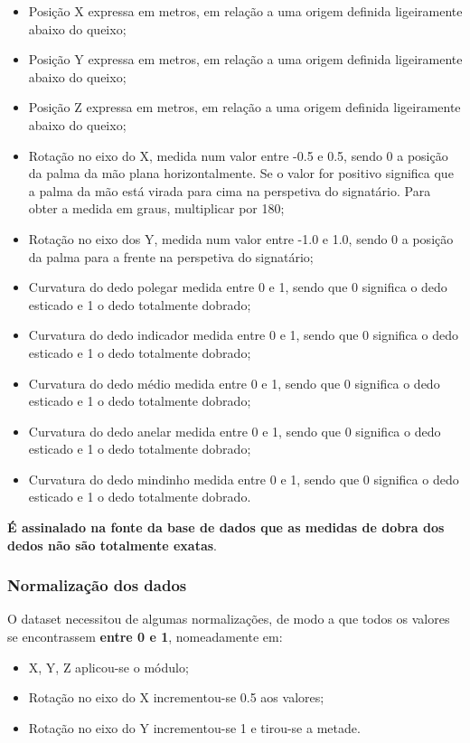 \documentclass[10pt,a4paper]{article}
\begin{document}
\begin{itemize}
\item Posição X expressa em metros, em relação a uma origem definida ligeiramente abaixo do queixo;
\item Posição Y expressa em metros, em relação a uma origem definida ligeiramente abaixo do queixo;
\item Posição Z expressa em metros, em relação a uma origem definida ligeiramente abaixo do queixo;
\item Rotação no eixo do X, medida num valor entre -0.5 e 0.5, sendo 0 a posição da palma da mão plana horizontalmente. Se o valor for positivo significa que a palma da mão está virada para cima na perspetiva do signatário. Para obter a medida em graus, multiplicar por 180;
\item Rotação no eixo dos Y, medida num valor entre -1.0 e 1.0, sendo 0 a posição da palma para a frente na perspetiva do signatário;
\item Curvatura do dedo polegar medida entre 0 e 1, sendo que 0 significa o dedo esticado e 1 o dedo totalmente dobrado;
\item Curvatura do dedo indicador medida entre 0 e 1, sendo que 0 significa o dedo esticado e 1 o dedo totalmente dobrado;
\item Curvatura do dedo médio medida entre 0 e 1, sendo que 0 significa o dedo esticado e 1 o dedo totalmente dobrado;
\item Curvatura do dedo anelar medida entre 0 e 1, sendo que 0 significa o dedo esticado e 1 o dedo totalmente dobrado;
\item Curvatura do dedo mindinho medida entre 0 e 1, sendo que 0 significa o dedo esticado e 1 o dedo totalmente dobrado.
\end{itemize}
\textbf{É assinalado na fonte da base de dados que as medidas de dobra dos dedos não são totalmente exatas}.

\subsubsection{Normalização dos dados}

O dataset necessitou de algumas normalizações, de modo a que todos os valores se encontrassem \textbf{entre 0 e 1}, nomeadamente em:
\begin{itemize}
\item X, Y, Z aplicou-se o módulo;
\item Rotação no eixo do X incrementou-se 0.5 aos valores;
\item Rotação no eixo do Y incrementou-se 1 e tirou-se a metade.
\end{itemize}
\end{document}
